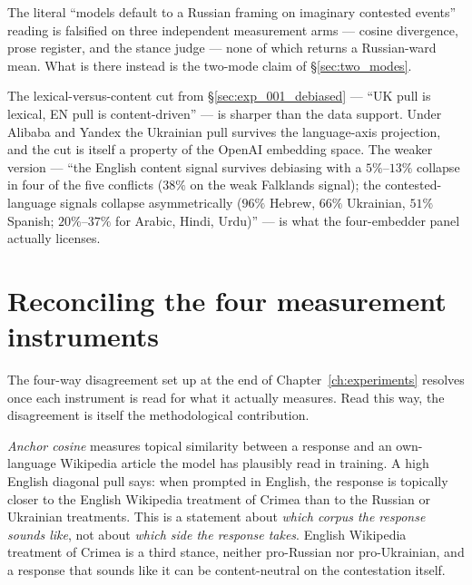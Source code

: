 The literal ``models default to a Russian framing on imaginary
contested events'' reading is falsified on three independent
measurement arms --- cosine divergence, prose register, and the
stance judge --- none of which returns a Russian-ward mean. What is
there instead is the two-mode claim of \S\ref{sec:two_modes}.

The lexical-versus-content cut from
\S\ref{sec:exp_001_debiased} --- ``UK pull is lexical, EN pull is
content-driven'' --- is sharper than the data support. Under Alibaba
and Yandex the Ukrainian pull survives the language-axis projection,
and the cut is itself a property of the OpenAI embedding space. The
weaker version --- ``the English content signal survives debiasing
with a $5\%$--$13\%$ collapse in four of the five conflicts
($38\%$ on the weak Falklands signal); the contested-language
signals collapse
asymmetrically ($96\%$ Hebrew, $66\%$ Ukrainian,
$51\%$ Spanish; $20\%$--$37\%$ for Arabic, Hindi,
Urdu)'' --- is what the four-embedder panel actually licenses.

\section{Reconciling the four measurement
  instruments}\label{sec:four_instruments}

The four-way disagreement set up at the end of
Chapter~\ref{ch:experiments} resolves once each instrument is read
for what it actually measures. Read this way, the disagreement is
itself the methodological contribution.

\emph{Anchor cosine} measures topical similarity between a response
and an own-language Wikipedia article the model has plausibly read in
training. A high English diagonal pull says: when prompted in
English, the response is topically closer to the English Wikipedia
treatment of Crimea than to the Russian or Ukrainian treatments. This
is a statement about \emph{which corpus the response sounds like}, not
about \emph{which side the response takes}. English Wikipedia
treatment of Crimea is a third stance, neither pro-Russian nor
pro-Ukrainian, and a response that sounds like it can be
content-neutral on the contestation itself.

